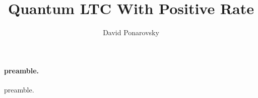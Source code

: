 \documentclass{article}
\begin{document}
\title{Quantum LTC With Positive Rate}
\author{David Ponarovsky}
\maketitle
\begin{multicols*}{2}
\newcommand{ \Hw }{ \delta\Delta -\Delta^{\frac{1}{2}-\varepsilon}/\delta  }
	\newcommand{ \Nw }{ \Delta^{\frac{3}{2}-\varepsilon}} 
	  \newcommand{ \Gu } { \Gamma^{\cup} }
	  \newcommand{ \Guq } { \Gamma^{\cup, \square} }

    	\newcommand{ \Gsa } {\Gamma_{\square_{1}} }
	\newcommand{ \Gsb } {\Gamma_{\square_{2}} }
        \newcommand{ \Aa } { C_{A_{1}}}  
	\newcommand{ \Ab } { C_{A_{2}}}
	\newcommand{ \Ac } { C_{A_{3}}}
	\newcommand{ \Aab } { \Aa \otimes \Ab } 
	\newcommand{ \Aac } { \Aa \otimes \Ac }
	\newcommand{ \Aabc } { \Aa \otimes \Ab \otimes \Ac }
	\newcommand{ \Aabp } { \Aa^{\perp} \otimes \Ab^{\perp} } 
	\newcommand{ \Aacp } { \Aa^{\perp} \otimes \Ac^{\perp} }
	\newcommand{ \Aabcp } { \Aa^{\perp} \otimes \Ab^{\perp} \otimes \Ac^{\perp} }
	\newcommand{ \Aabpp } { \left( \Aabp \right)^\perp } 
	\newcommand{ \Aacpp } { \left( \Aacp \right)^\perp }
	\newcommand{ \Aabcpp } { \left( \Aabcp \right)^\perp }
	\newcommand{ \YY } {  y_{1}y_{2}^{\top} }
	\newcommand{ \ZZ } {  z_{1}z_{2}^{\top} } 
	\newcommand{ \TT } { \tilde{\tau} } 


  \paragraph{preamble.} preamble.  

\end{multicols*}
\end{document}
